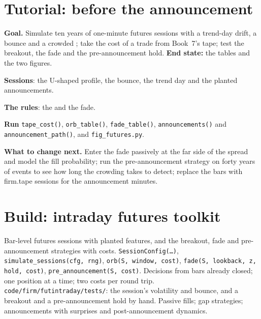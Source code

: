 \section{Tutorial: before the announcement}\label{tut:s1:short-term-futures-strategies:tut}

\begin{tutorial}
\textbf{Goal.} Simulate ten years of one-minute futures sessions with a trend-day drift, a bounce and a crowded ; take the cost of
a trade from Book~7's tape; test the breakout, the fade and the pre-announcement hold. \textbf{End state:} the tables and the two figures.
\begin{tutsteps}
\item \textbf{Sessions}: the U-shaped profile, the bounce, the trend day and the planted announcements.
\label{lst:s1:short-term-futures-strategies:sessions}
\item \textbf{The rules}: the  and the fade.
\label{lst:s1:short-term-futures-strategies:rules}
\item \textbf{Run} \texttt{tape\_cost()}, \texttt{orb\_table()}, \texttt{fade\_table()}, \texttt{announcements()} and \texttt{announcement\_path()}, and
\texttt{fig\_futures.py}.
\end{tutsteps}
\textbf{What to change next.} Enter the fade passively at the far side of the spread and model the fill probability; run the pre-announcement strategy on
forty years of events to see how long the crowding takes to detect; replace the bars with firm.tape sessions for the announcement minutes.
\end{tutorial}

\section{Build: intraday futures toolkit}\label{bld:s1:short-term-futures-strategies:futintraday}

\begin{build}
 Bar-level futures sessions with planted features, and the breakout, fade and pre-announcement strategies with costs.
 \texttt{SessionConfig(\dots)}, \texttt{simulate\_sessions(cfg, rng)}, \texttt{orb(S, window, cost)}, \texttt{fade(S, lookback, z, hold,
cost)}, \texttt{pre\_announcement(S, cost)}.
 Decisions from bars already closed; one position at a time; two costs per round trip.
 \texttt{code/firm/futintraday/tests/}: the session's volatility and bounce, and a breakout and a pre-announcement hold by hand.
 Passive fills; gap strategies; announcements with surprises and post-announcement dynamics.
\end{build}

